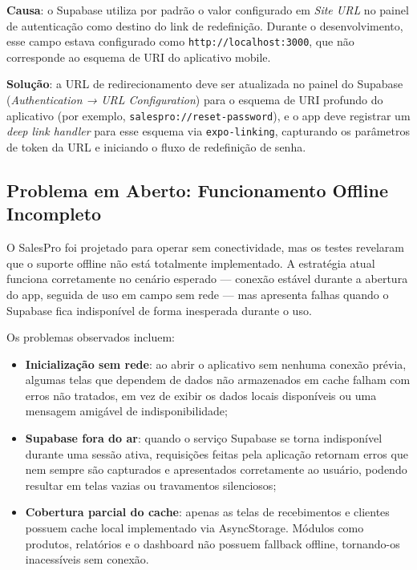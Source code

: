 \documentclass[
	12pt,				%
	oneside,			%
	a4paper,			%
	english,			%
	brazil				%
	]{abntex2}
\begin{document}
\textbf{Causa}: o Supabase utiliza por padrão o valor configurado em \textit{Site URL} no painel de autenticação como destino do link de redefinição. Durante o desenvolvimento, esse campo estava configurado como \texttt{http://localhost:3000}, que não corresponde ao esquema de URI do aplicativo mobile.

\textbf{Solução}: a URL de redirecionamento deve ser atualizada no painel do Supabase (\textit{Authentication → URL Configuration}) para o esquema de URI profundo do aplicativo (por exemplo, \texttt{salespro://reset-password}), e o app deve registrar um \textit{deep link handler} para esse esquema via \texttt{expo-linking}, capturando os parâmetros de token da URL e iniciando o fluxo de redefinição de senha.

\subsection{Problema em Aberto: Funcionamento Offline Incompleto}

O SalesPro foi projetado para operar sem conectividade, mas os testes revelaram que o suporte offline não está totalmente implementado. A estratégia atual funciona corretamente no cenário esperado — conexão estável durante a abertura do app, seguida de uso em campo sem rede — mas apresenta falhas quando o Supabase fica indisponível de forma inesperada durante o uso.

Os problemas observados incluem:

\begin{itemize}
  \item \textbf{Inicialização sem rede}: ao abrir o aplicativo sem nenhuma conexão prévia, algumas telas que dependem de dados não armazenados em cache falham com erros não tratados, em vez de exibir os dados locais disponíveis ou uma mensagem amigável de indisponibilidade;
  \item \textbf{Supabase fora do ar}: quando o serviço Supabase se torna indisponível durante uma sessão ativa, requisições feitas pela aplicação retornam erros que nem sempre são capturados e apresentados corretamente ao usuário, podendo resultar em telas vazias ou travamentos silenciosos;
  \item \textbf{Cobertura parcial do cache}: apenas as telas de recebimentos e clientes possuem cache local implementado via AsyncStorage. Módulos como produtos, relatórios e o dashboard não possuem fallback offline, tornando-os inacessíveis sem conexão.
\end{itemize}
\end{document}
